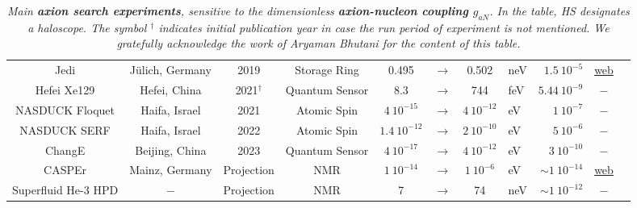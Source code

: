\begin{table}[!th]
\begin{center}
{\begin{tabular}{ccccccclrcc}
        \rule{0pt}{1ex}
        {\sc Jedi} & J\"ulich, Germany & 2019 & Storage Ring & 0.495 &$\to$ & 0.502 &neV & $1.5\ 10^{-5}$ & \href{http://collaborations.fz-juelich.de/ikp/jedi/index.shtml}{web} & \cite{JEDI}
        \\

        \rule{0pt}{1ex}
        {\sc Hefei Xe129} & Hefei, China  & 2021$^{\dagger}$ & Quantum Sensor & 8.3 &$\to$ & 744  &feV & $5.44\ 10^{-9}$ & $-$ & \cite{HEFEI}
        \\

        \rule{0pt}{1ex}
        {\sc NASDUCK Floquet} & Haifa, Israel & 2021 & Atomic Spin & $4\ 10^{-15}$ &$\to$ & $4\ 10^{-12}$ &eV & $1\ 10^{-7}$ & $-$ & \cite{NASDUCK}
        \\

        \rule{0pt}{1ex}
        {\sc NASDUCK SERF} & Haifa, Israel & 2022 & Atomic Spin & $1.4\ 10^{-12}$ &$\to$ &$2\ 10^{-10}$ &eV & $5\ 10^{-6}$ & $-$ & \cite{NASDUCK-SERF}
        \\
        
        \rule{0pt}{1ex}
        {\sc ChangE} & Beijing, China & 2023 & Quantum Sensor & $4\ 10^{-17}$ &$\to$ & $4\ 10^{-12}$ &eV & $3\ 10^{-10}$ & $-$ & \cite{CHANGE}
        \\

        \rule{0pt}{1ex}
        {\sc CASPEr} & Mainz, Germany & Projection & NMR & $1\ 10^{-14}$ &$\to$ & $1\ 10^{-6}$ &eV & $\sim1\ 10^{-14}$ & \href{https://budker.uni-mainz.de/?page_id=7}{web} & \cite{CASPER}
        \\

        \rule{0pt}{1ex}
        {\sc Superfluid He-3 HPD} & $-$  & Projection & NMR & 7 &$\to$ & 74 &neV & $\sim1\ 10^{-12}$ & $-$ & \cite{He-3_HPD}
        \\
        \hline\hline
      \end{tabular}
    }
  \end{center}
          \caption[Main axion-nucleon experiments]{\label{tab:AxionNexp}\em Main {\bfseries axion search experiments}, sensitive to the dimensionless {\bfseries axion-nucleon coupling $g_{aN}$}. In the table, HS designates a {\em haloscope}. The symbol $^\dagger$ indicates initial publication year in case the run period of experiment is not mentioned. We gratefully acknowledge the work of Aryaman Bhutani  for the content of this table.}
          



\end{table}
